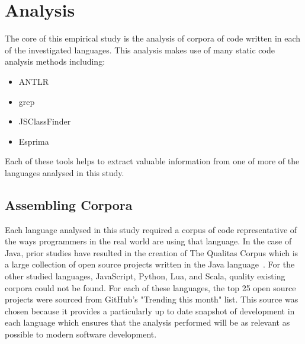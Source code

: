 \chapter{Analysis}\label{C:analysis} 
The core of this empirical study is the analysis of corpora of code written in each of the investigated languages. This analysis makes use of many static code analysis methods including:
\begin{itemize}
	\item ANTLR
	\item grep
	\item JSClassFinder
	\item Esprima
\end{itemize}
Each of these tools helps to extract valuable information from one of more of the languages analysed in this study.

\section{Assembling Corpora}
Each language analysed in this study required a corpus of code representative of the ways programmers in the real world are using that language. In the case of Java, prior studies have resulted in the creation of The Qualitas Corpus which is a large collection of open source projects written in the Java language~\cite{QualitasCorpus}. \newline
For the other studied languages, JavaScript, Python, Lua, and Scala, quality existing corpora could not be found. For each of these languages, the top 25 open source projects were sourced from GitHub's "Trending this month" list. This source was chosen because it provides a particularly up to date snapshot of development in each language which ensures that the analysis performed will be as relevant as possible to modern software development.

